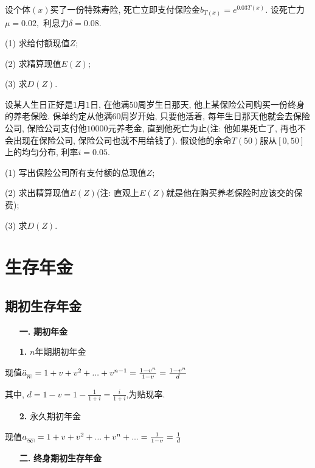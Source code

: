 \documentclass[a4paper,10pt]{ctexbook}
\makeatletter
\newcommand{\hei}{\CJKfamily{hei}}      %
\DeclareRobustCommand{\annu}[1]{_{%
    \def\arraystretch{0}%
    \setlength\arraycolsep{1pt}%
    \setlength\arrayrulewidth{.2pt}%
    \begin{array}[b]{@{}c|}\hline
        \\[\arraycolsep]%
        \scriptstyle #1%
    \end{array}%
}}
\makeatother
\begin{document}
\begin{exs}
    设个体$(x)$买了一份特殊寿险, 死亡立即支付保险金$b_{T(x)}=e^{0.03T(x)}.$ 设死亡力$\mu=0.02,$ 利息力$\delta=0.08.$

    (1) 求给付额现值$Z;$

    (2) 求精算现值$E(Z);$

    (3) 求$D(Z).$
\end{exs}

\begin{exs}
    设某人生日正好是$1$月$1$日, 在他满$50$周岁生日那天, 他上某保险公司购买一份终身的养老保险. 保单约定从他满$60$周岁开始, 只要他活着, 每年生日那天他就会去保险公司, 保险公司支付他$10000$元养老金, 直到他死亡为止(注: 他如果死亡了, 再也不会出现在保险公司, 保险公司也就不用给钱了). 假设他的余命$T(50)$服从$[0,50]$上的均匀分布, 利率$i=0.05.$

    (1) 写出保险公司所有支付额的总现值$Z$;

    (2) 求出精算现值$E(Z)$(注: 直观上$E(Z)$就是他在购买养老保险时应该交的保费);

    (3) 求$D(Z).$
\end{exs}


\chapter{生存年金}
\section{期初生存年金}
\begin{itemize}
    \item[{\bf\hei 一.}]{\bf\hei 期初年金}
\end{itemize}

\begin{itemize}
    \item[{\bf\hei 1.}]$n$年期期初年金
\end{itemize}

现值$\ddot a_{\annu n}=1+v+v^2+...+v^{n-1}=\frac{1-v^n}{1-v}=\frac{1-v^n}{d}$

其中, $d=1-v=1-\frac{1}{1+i}=\frac{i}{1+i}$,为贴现率.
\begin{itemize}
    \item[{\bf\hei 2.}]永久期初年金
\end{itemize}

现值$a_{\annu {\infty}}=1+v+v^2+...+v^n+...=\frac{1}{1-v}=\frac{1}{d}$
\begin{itemize}
    \item[{\bf\hei 二.}]{\bf\hei 终身期初生存年金}
\end{itemize}
\end{document}
